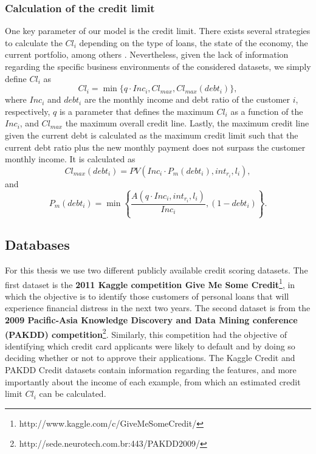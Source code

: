   \subsubsection{Calculation of the credit limit}
  
  One key parameter of our model is the credit limit. There exists several strategies to calculate 
  the $Cl_i$ depending on the type of loans, the state of the economy, the current portfolio, 
  among others \citep{Anderson2007,Lawrence2012}. Nevertheless, given the lack of information 
  regarding the specific business environments of the considered datasets, we simply define 
  $Cl_i$ as
  \begin{equation}\label{eq:cli}
      Cl_i = \min \bigg\{ q \cdot Inc_i, Cl_{max}, Cl_{max}(debt_i) \bigg\},
  \end{equation}
  where $Inc_i$ and $debt_i$ are the monthly income and debt ratio of the customer $i$, 
  respectively, $q$ is a parameter that defines the maximum $Cl_i$ as a function of the $Inc_i$, 
  and  $Cl_{max}$ the maximum overall credit line. Lastly, the maximum credit line given the 
  current debt is calculated as the maximum credit limit such that the current debt ratio plus the 
  new  monthly payment does not surpass the customer monthly income. It is calculated as
  \begin{equation}
    Cl_{max}(debt_i)=PV\left(Inc_i \cdot P_{m}(debt_i),int_{r_i},l_i\right),
  \end{equation}
  and
  \begin{equation}
    P_{m}(debt_i)=\min \left\{ \frac{A(q \cdot Inc_i,int_{r_i},l_i)}{Inc_i},\left(1-debt_i 
    \right) \right\}.
  \end{equation}
  
  
  \subsection{Databases}

    For this thesis we use two different publicly available credit scoring datasets. The first 
    dataset is the \textbf{2011 Kaggle competition Give Me Some Credit}\footnote{ 
    http://www.kaggle.com/c/GiveMeSomeCredit/}, in which the objective is to identify those 
    customers of personal loans that will experience financial distress in the next two years.
    The second dataset is from the \textbf{2009 Pacific-Asia Knowledge Discovery and Data Mining 
    conference (PAKDD) competition}\footnote{http://sede.neurotech.com.br:443/PAKDD2009/}.
    Similarly, this competition had the objective of identifying which credit card applicants
    were likely to default and by doing so deciding whether or not to approve their applications.
    The Kaggle Credit and PAKDD Credit datasets contain information regarding the features, and 
    more importantly about the income of each example, from which an estimated credit limit 
    $Cl_i$ can be calculated.
    
